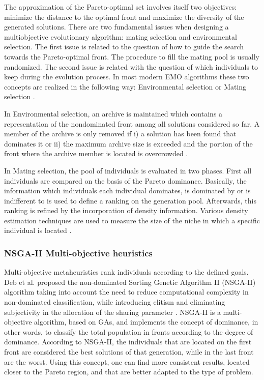 \documentclass{report}
\begin{document}
The approximation of the Pareto-optimal set involves itself two objectives: minimize the distance to the optimal front and maximize the diversity of the generated solutions. There are two fundamental issues when designing a multiobjective evolutionary algorithm: mating selection and environmental selection. The first issue is related to the question of how to guide the search towards the Pareto-optimal front. The procedure to fill the mating pool is usually randomized. The second issue is related with the question of which individuals to keep during the evolution process. In most modern EMO algorithms these two concepts are realized in the following way: Environmental selection or Mating selection \cite{Zitzler2001}.

In  Environmental selection, an archive is maintained which contains a representation of the nondominated front among all solutions considered so far. A member of the archive is only removed if i) a solution has been found that dominates it or ii) the maximum archive size is exceeded and the portion of the front where the archive member is located is overcrowded \cite{Zitzler2001}. 

In Mating selection, the pool of individuals is evaluated in two phases. First all individuals are compared on the basis of the Pareto dominance. Basically, the information which individuals each individual dominates, is dominated by or is indifferent to is used to define a ranking on the generation pool. Afterwards, this ranking is refined by the incorporation of density information. Various density estimation techniques are used to measure the size of the niche in which a specific individual is located \cite{Zitzler2001}.


\subsubsection{NSGA-II Multi-objective heuristics}


Multi-objective metaheuristics rank individuals according to the defined goals. Deb et al.  proposed the non-dominated Sorting Genetic Algorithm II (NSGA-II) algorithm taking into account the need to reduce computational complexity in non-dominated classification, while introducing elitism and eliminating subjectivity in the allocation of the sharing parameter \cite{Deb2000}. NSGA-II is a multi-objective algorithm, based on GAs, and implements the concept of dominance, in other words, to classify the total population in fronts according to the degree of dominance. According to NSGA-II, the individuals that are located on the first front are considered the best solutions of that generation, while in the last front are the worst. Using this concept, one can find more consistent results, located closer to the Pareto region, and that are better adapted to the type of problem. 
\end{document}
